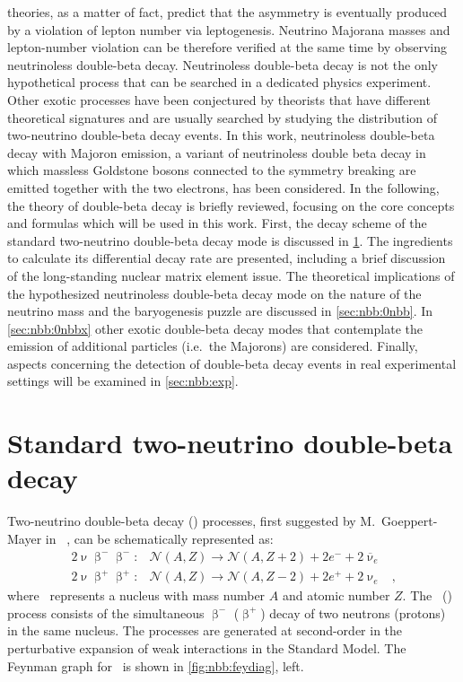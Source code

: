 theories, as a matter of fact, predict that the asymmetry is eventually produced by a
violation of lepton number via leptogenesis. Neutrino Majorana masses and lepton-number
violation can be therefore verified at the same time by observing neutrinoless double-beta
decay.
\newpar
Neutrinoless double-beta decay is not the only hypothetical process that can be searched
in a dedicated physics experiment. Other exotic processes have been conjectured by
theorists that have different theoretical signatures and are usually searched by studying
the distribution of two-neutrino double-beta decay events. In this work, neutrinoless
double-beta decay with Majoron emission, a variant of neutrinoless double beta decay in
which massless Goldstone bosons connected to the symmetry breaking are emitted together
with the two electrons, has been considered.
\newpar
In the following, the theory of double-beta decay is briefly reviewed, focusing on the
core concepts and formulas which will be used in this work. First, the decay scheme of the
standard two-neutrino double-beta decay mode is discussed in \cref{sec:nbb:2nbb}. The
ingredients to calculate its differential decay rate are presented, including a brief
discussion of the long-standing nuclear matrix element issue. The theoretical implications
of the hypothesized neutrinoless double-beta decay mode on the nature of the neutrino mass
and the baryogenesis puzzle are discussed in \cref{sec:nbb:0nbb}. In \cref{sec:nbb:0nbbx}
other exotic double-beta decay modes that contemplate the emission of additional particles
(i.e.~the Majorons) are considered. Finally, aspects concerning the detection of
double-beta decay events in real experimental settings will be examined in
\cref{sec:nbb:exp}.

\section{Standard two-neutrino double-beta decay}%
\label{sec:nbb:2nbb}

Two-neutrino double-beta decay (\nnbb) processes, first suggested by M.~Goeppert-Mayer
in ~\cite{GoeppertMayer1935}, can be schematically represented as:
\[
  \begin{array}{llr}
    2\upnu\upbeta^-\upbeta^-: &
      \mathcal{N}(A,Z) \longrightarrow \mathcal{N}(A,Z+2)+2e^-+2{\overline \upnu}_e & \\
    2\upnu\upbeta^+\upbeta^+: &
      \mathcal{N}(A,Z) \longrightarrow \mathcal{N}(A,Z-2)+2e^++2\upnu_e &,
  \end{array}
\]
where \NAZ\ represents a nucleus with mass number $A$ and atomic number $Z$. The \nnbbm\
(\nnbbp) process consists of the simultaneous $\upbeta^-$ ($\upbeta^+$) decay of two
neutrons (protons) in the same nucleus. The processes are generated at second-order in the
perturbative expansion of weak interactions in the Standard Model. The Feynman graph for
\nnbbm\ is shown in \cref{fig:nbb:feydiag}, left.

